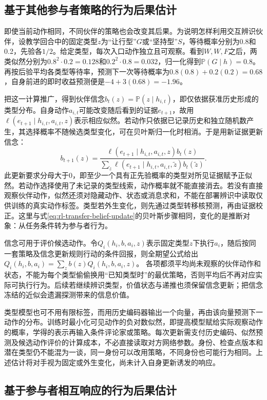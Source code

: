 \subsection{基于其他参与者策略的行为后果估计}
\label{sec:rl-multi-agent-opponent-model}

即使当前动作相同，不同伙伴的策略也会改变其后果。为说明怎样利用交互辨识伙伴，设教学回合中的固定类型$z$为“让行型”$G$或“坚持型”$S$，等待概率分别为0.8和0.2，先验各$1/2$。给定类型，每次入口动作独立且可观察。看到$W,W,F$之后，两类似然分别为$0.8^2\cdot0.2=0.128$和$0.2^2\cdot0.8=0.032$，归一化得到$\mathbb P(G\mid h)=0.8$。再按后验平均各类型等待率，预测下一次等待概率为$0.8(0.8)+0.2(0.2)=0.68$，自身前进的即时收益预测便是$-4+3(0.68)=-1.96$。

把这一计算推广，得到伙伴信念$b_t(z)=\mathbb P(z\mid h_{i,t})$，即仅依据获准历史形成的类型分布。自身动作$a_{i,t}$可能改变随后看到的证据$e_{t+1}$，故用$\ell(e_{t+1}\mid h_{i,t},a_{i,t},z)$表示相应似然。若动作只依据已记录历史和独立随机数产生，其选择概率不随候选类型变化，可在贝叶斯归一化时相消。于是用新证据更新信念：
\[
 b_{t+1}(z)=
 \frac{\ell(e_{t+1}\mid h_{i,t},a_{i,t},z)b_t(z)}
      {\sum_{\tilde z}\ell(e_{t+1}\mid h_{i,t},a_{i,t},\tilde z)b_t(\tilde z)}.
\]
此更新要求分母大于0，即至少一个具有正先验概率的类型对所见证据赋予正似然。若动作选择使用了未记录的类型线索，动作概率就不能直接消去。若没有直接观察伙伴动作，似然还须对隐藏动作、状态或消息求和，不能在部署辨识中读取仅供训练的真实动作标签。类型若外生变化，则先通过类型转移核预测，再由证据校正。这里与式\eqref{eq:rl-transfer-belief-update}的贝叶斯步骤相同，变化的是推断对象：从任务条件转为参与者行为。

信念可用于评价候选动作。令$Q_i(h_i,b,a_i,z)$表示固定类型$z$下执行$a_i$，随后按同一套策略及信念更新规则行动的条件回报，则全期望公式给出
$Q_i(h_i,b,a_i)=\sum_z b(z)Q_i(h_i,b,a_i,z)$。
各项都须平均尚未观察的伙伴动作和状态，不能为每个类型偷偷换用“已知类型时”的最优策略，否则平均后不再对应实际可执行行为。后续若继续辨识类型，价值状态与递推也须保留信念更新；把信念冻结的近似会遗漏探测带来的信息价值。

类型模型也可不用有限标签，而用历史编码器输出一个向量，再由该向量预测下一动作的分布。训练时最小化可见动作的负对数似然，即提高模型赋给实际观察动作的概率，学得的表示再输入条件评论家或策略。每次更新需支付历史编码、似然预测及候选动作评价的计算成本，不必直接读取对方网络参数。身份、检查点版本和潜在类型仍不能混为一谈，同一身份可以改用策略，不同身份也可能行为相同。上述估计将对手视为固定或外生变化，尚未计入自身更新诱发的响应。

\subsection{基于参与者相互响应的行为后果估计}
\label{sec:rl-multi-agent-response-model}

